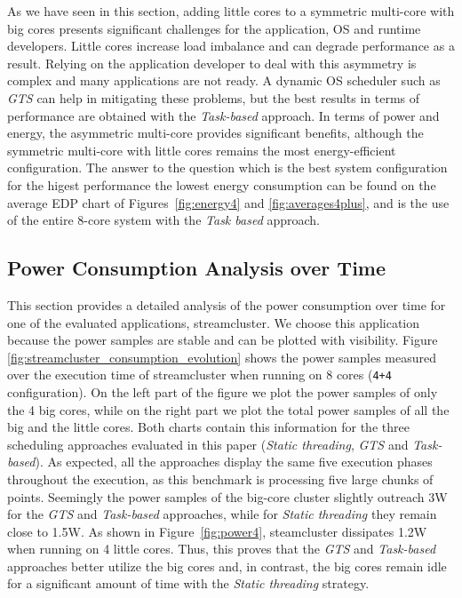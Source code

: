 As we have seen in this section, adding little cores to a symmetric multi-core with big cores presents significant challenges for the application, OS and runtime developers. Little cores increase load imbalance and can degrade performance as a result. Relying on the application developer to deal with this asymmetry is complex and many applications are not ready. A dynamic OS scheduler such as \emph{GTS} can help in mitigating these problems, but the best results in terms of performance are obtained with the \emph{Task-based} approach. In terms of power and energy, the asymmetric multi-core provides significant benefits, although the symmetric multi-core with little cores remains the most energy-efficient configuration. The answer to the question which is the best system configuration for the higest performance the lowest energy consumption can be found on the average EDP chart of Figures~\ref{fig:energy4} and \ref{fig:averages4plus}, and is the use of the entire 8-core system with the \emph{Task based} approach.


\subsection{Power Consumption Analysis over Time}


This section provides a detailed analysis of the power consumption over time for one of the evaluated applications, streamcluster.
We choose this application because the power samples are stable and can be plotted with visibility.
Figure \ref{fig:streamcluster_consumption_evolution} shows the power samples measured over the execution time of streamcluster when running on 8 cores (\texttt{4+4} configuration).
On the left part of the figure we plot the power samples of only the 4 big cores, while on the right part we plot the total power samples of all the big and the little cores.
Both charts contain this information for the three scheduling approaches evaluated in this paper (\emph{Static threading}, \emph{GTS} and \emph{Task-based}).
As expected, all the approaches display the same five execution phases throughout the execution, as this benchmark is processing five large chunks of points.
Seemingly the power samples of the big-core cluster slightly outreach 3W for the \emph{GTS} and \emph{Task-based} approaches, while for \emph{Static threading} they remain close to 1.5W. As shown in Figure~\ref{fig:power4}, steamcluster dissipates 1.2W when running on 4 little cores.
Thus, this proves that the \emph{GTS} and \emph{Task-based} approaches better utilize the big cores and, in contrast, the big cores remain idle for a significant amount of time with the \emph{Static threading} strategy.

